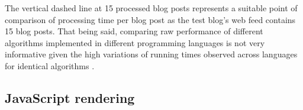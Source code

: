 The vertical dashed line at 15 processed blog posts represents a suitable point of comparison of processing time per blog post as the test blog's web feed contains 15 blog posts. That being said, comparing raw performance of different algorithms implemented in different programming languages is not very informative given the high variations of running times observed across languages for identical algorithms \cite{hundt2011}.



\subsection{JavaScript rendering}

\TODO{}





